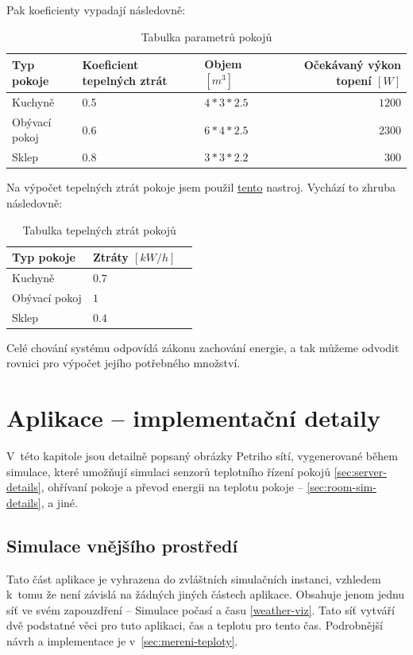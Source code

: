 Pak koeficienty vypadají následovně:

\begin{table}[H]
  \vskip6pt
  \caption{Tabulka parametrů pokojů}
   \vskip6pt
  \centering
  \begin{tabular}{lllr}
    \toprule
    Typ pokoje & Koeficient tepelných ztrát & Objem $[m^3]$ & Očekávaný výkon topení $[W]$ \\
   \midrule
   Kuchyně & 0.5 & $4*3*2.5$ & $1200$ \\
   Obývací pokoj & 0.6 & $6*4*2.5$ & $2300$ \\
   Sklep & 0.8 & $3*3*2.2$ & $300$ \\
    \bottomrule
  \end{tabular}
  \label{tab:Parametry}
\end{table}

Na výpočet tepelných ztrát pokoje jsem použil \href{https://wpcalc.com/kalkulyator-teplopoter/}{tento} nastroj.
Vychází to zhruba následovně:

\begin{table}[H]
  \vskip6pt
  \caption{Tabulka tepelných ztrát pokojů}
   \vskip6pt
  \centering
  \begin{tabular}{llr}
    \toprule
    Typ pokoje & Ztráty $[kW/h]$ \\
    \midrule
    Kuchyně & $0.7$ \\
   Obývací pokoj & $1$ \\
   Sklep & $0.4$ \\
    \bottomrule
  \end{tabular}
  \label{tab:tepelne-ztraty}
\end{table}

Celé chování systému odpovídá zákonu zachování energie, a tak můžeme odvodit rovnici pro výpočet jejího potřebného množství.

\chapter{Aplikace -- implementační detaily}
\label{chap:app-implementation}

V~této kapitole jsou detailně popsaný obrázky Petriho sítí, vygenerované během simulace, které umožňují simulaci senzorů teplotního řízení pokojů \ref{sec:server-details}, ohřívaní pokoje a převod energii na teplotu pokoje -- \ref{sec:room-sim-details}, a jiné.

\section{Simulace vnějšího prostředí}
Tato část aplikace je vyhrazena do zvláštních simulačních instanci, vzhledem k~tomu že není závislá na žádných jiných částech aplikace. Obsahuje jenom jednu síť ve svém zapouzdření -- Simulace počasí a času \ref{weather-viz}. Tato síť vytváří dvě podstatné věci pro tuto aplikaci, čas a teplotu pro tento čas. Podrobnější návrh a implementace je v~\ref{sec:mereni-teploty}.

